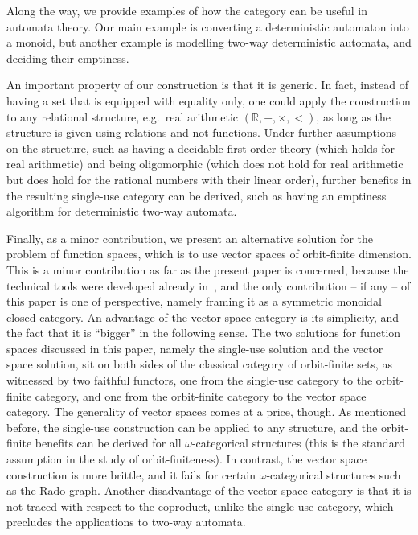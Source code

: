 \documentclass[10pt,a4paper]{amsart}
\numberwithin{equation}{section}
\theoremstyle{plain}
\begin{document}
Along the way, we provide examples of how the category can be useful in automata theory. Our main example is converting a deterministic automaton into a monoid, but another example is modelling two-way deterministic automata, and deciding their emptiness. 

An important property of our construction is that it is generic. In fact, instead of having a set that is equipped with equality only, one could apply the construction to any relational structure, e.g.~real arithmetic $(\mathbb R, +, \times, <)$, as long as the structure is given using relations and not functions. Under further assumptions on the structure, such as having a decidable first-order theory (which holds for real arithmetic) and being oligomorphic (which does not hold for real arithmetic but does hold for the rational numbers with their linear order), further benefits in the resulting single-use category can be derived, such as having an emptiness algorithm for deterministic two-way automata. 

Finally, as a minor contribution, we present an alternative solution for the problem of function spaces, which is  to use vector spaces of orbit-finite dimension. This is a minor contribution as far as the present paper is concerned, because the technical tools were developed already in~\cite{bojanczykKM21OrbitFiniteVector}, and the only contribution -- if any -- of this paper is one of perspective, namely framing it as a symmetric monoidal closed category. An advantage of the vector space category is its simplicity, and the fact that it is ``bigger'' in the following sense. The two solutions for function spaces discussed in this paper, namely the single-use solution and the vector space solution, sit on both sides of the classical category of orbit-finite sets, as witnessed by two faithful functors, one from the single-use category to the orbit-finite category, and one from the orbit-finite category to the vector space category. 
The generality of vector spaces comes at a price, though. As mentioned before, the single-use construction can be applied to any structure, and the orbit-finite benefits can be derived for all $\omega$-categorical structures (this is the standard assumption in the study of orbit-finiteness). In contrast, the vector space construction is more brittle, and it fails for certain $\omega$-categorical  structures such as the Rado graph.   Another disadvantage of the vector space category is that it is not traced with respect to the coproduct, unlike the single-use category, which precludes the applications to two-way automata.
\end{document}
